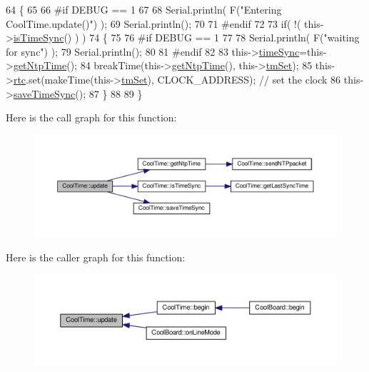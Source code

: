 \begin{DoxyCode}
64 \{
65 
66 \textcolor{preprocessor}{#if DEBUG == 1}
67 
68     Serial.println( F(\textcolor{stringliteral}{"Entering CoolTime.update()"}) );
69     Serial.println();
70 
71 \textcolor{preprocessor}{#endif }
72 
73     \textcolor{keywordflow}{if}( !( this->\hyperlink{classCoolTime_a5ae038a4498602b189f76a10bf02adf8}{isTimeSync}() ) )
74     \{
75     
76 \textcolor{preprocessor}{    #if DEBUG == 1}
77 
78         Serial.println( F(\textcolor{stringliteral}{"waiting for sync"}) );
79         Serial.println();
80 
81 \textcolor{preprocessor}{    #endif }
82 
83         this->\hyperlink{classCoolTime_a9d032e76c3470a15b3bbbc52af6463f7}{timeSync}=this->\hyperlink{classCoolTime_a41fbbbfd651c2079f54d4b2911e4c705}{getNtpTime}();
84         breakTime(this->\hyperlink{classCoolTime_a41fbbbfd651c2079f54d4b2911e4c705}{getNtpTime}(), this->\hyperlink{classCoolTime_ad33c2713c903ff064ad09c46406ae088}{tmSet});
85         this->\hyperlink{classCoolTime_abd38f2384ff90692b1568d9db869412e}{rtc}.set(makeTime(this->\hyperlink{classCoolTime_ad33c2713c903ff064ad09c46406ae088}{tmSet}), CLOCK\_ADDRESS); \textcolor{comment}{// set the clock}
86         this->\hyperlink{classCoolTime_ae9658c9b377510d469e3b88edf33ee85}{saveTimeSync}();
87     \}
88     
89 \}
\end{DoxyCode}
Here is the call graph for this function\+:\nopagebreak
\begin{figure}[H]
\begin{center}
\leavevmode
\includegraphics[width=350pt]{classCoolTime_aae601f795452cfa48d9fb337aed483a8_cgraph}
\end{center}
\end{figure}
Here is the caller graph for this function\+:\nopagebreak
\begin{figure}[H]
\begin{center}
\leavevmode
\includegraphics[width=350pt]{classCoolTime_aae601f795452cfa48d9fb337aed483a8_icgraph}
\end{center}
\end{figure}


